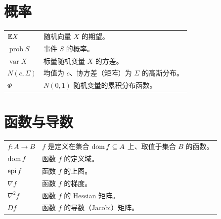 \section*{概率}
\begin{longtable}{@{}p{}p{}@{}}
$\mathbb E X$ & 随机向量 $X$ 的期望。\\
$\operatorname{prob}S$ & 事件 $S$ 的概率。\\
$\operatorname{var}X$ & 标量随机变量 $X$ 的方差。\\
$N(c,\Sigma)$ & 均值为 $c$、协方差（矩阵）为 $\Sigma$ 的高斯分布。\\
$\Phi$ & $N(0,1)$ 随机变量的累积分布函数。
\end{longtable}

\section*{函数与导数}
\begin{longtable}{@{}p{}p{}@{}}
$f:A\to B$ & $f$ 是定义在集合 $\operatorname{dom} f\subseteq A$ 上、取值于集合 $B$ 的函数。\\
$\operatorname{dom} f$ & 函数 $f$ 的定义域。\\
$\operatorname{epi} f$ & 函数 $f$ 的上图。\\
$\nabla f$ & 函数 $f$ 的梯度。\\
$\nabla^2 f$ & 函数 $f$ 的 Hessian 矩阵。\\
$Df$ & 函数 $f$ 的导数（Jacobi）矩阵。
\end{longtable}
